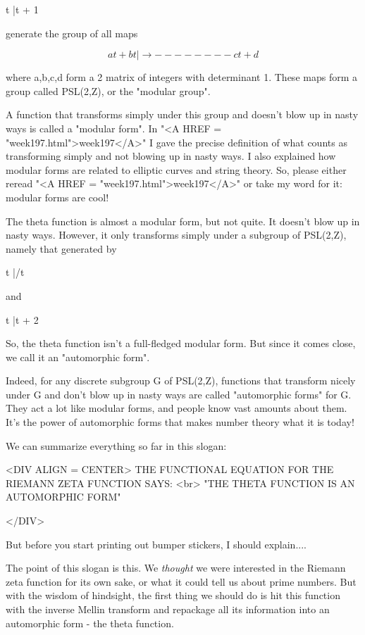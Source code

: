 t |\to  t + 1

generate the group of all maps


$$

       at + b
t |\to   --------
       ct + d
$$
    
where a,b,c,d form a 2 matrix of integers with determinant 1.  
These maps form a group called PSL(2,Z), or the "modular group".  

A function that transforms simply under this group and doesn't blow up 
in nasty ways is called a "modular form".  In "<A HREF = "week197.html">week197</A>" I gave the precise 
definition of what counts as transforming simply and not blowing up in 
nasty ways.  I also explained how modular forms are related to elliptic 
curves and string theory.  So, please either reread "<A HREF = "week197.html">week197</A>" or take my 
word for it: modular forms are cool!  

The theta function is almost a modular form, but not quite.  It doesn't 
blow up in nasty ways.  However, it only transforms simply under a subgroup 
of PSL(2,Z), namely that generated by 

t |/t

and

t |\to  t + 2

So, the theta function isn't a full-fledged modular form.  
But since it comes close, we call it an "automorphic form".

Indeed, for any discrete subgroup G of PSL(2,Z), functions that transform 
nicely under G and don't blow up in nasty ways are called "automorphic forms" 
for G.  They act a lot like modular forms, and people know vast amounts 
about them.  It's the power of automorphic forms that makes number theory 
what it is today!

We can summarize everything so far in this slogan:

<DIV ALIGN = CENTER>
    THE FUNCTIONAL EQUATION FOR THE RIEMANN ZETA FUNCTION SAYS: <br> 
           "THE THETA FUNCTION IS AN AUTOMORPHIC FORM"

</DIV>

But before you start printing out bumper stickers, I should explain....


The point of this slogan is this.  We \emph{thought} we were interested in 
the Riemann zeta function for its own sake, or what it could tell us 
about prime numbers.  But with the wisdom of hindsight, the first thing we 
should do is hit this function with the inverse 
Mellin transform and repackage all 
its information into an automorphic form - the theta function.  

